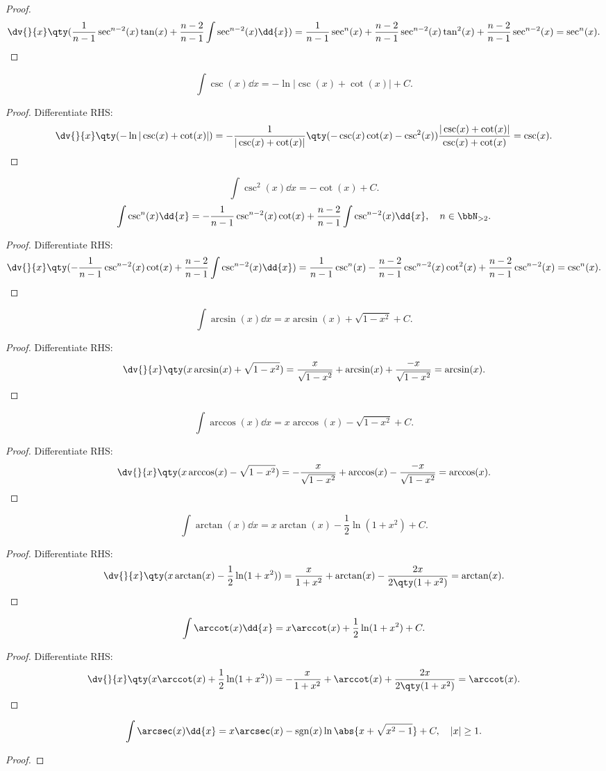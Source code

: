 \documentclass[a4paper,12pt]{report}
\begin{document}
\begin{itemize}
\begin{itemize}
\begin{proof}
    \[\dv{}{x}\qty(\frac{1}{n-1}\sec^{n-2}(x)\tan(x)+\frac{n-2}{n-1}\int\sec^{n-2}(x)\dd{x})=\frac{1}{n-1}\sec^n(x)+\frac{n-2}{n-1}\sec^{n-2}(x)\tan^2(x)+\frac{n-2}{n-1}\sec^{n-2}(x)=\sec^n(x).\]
\end{proof}
\[\int\csc(x)\dd{x}=-\ln|\csc(x)+\cot(x)|+C.\]
\begin{proof}
    Differentiate RHS:
    \[\dv{}{x}\qty(-\ln|\csc(x)+\cot(x)|)=-\frac{1}{|\csc(x)+\cot(x)|}\qty(-\csc(x)\cot(x)-\csc^2(x))\frac{|\csc(x)+\cot(x)|}{\csc(x)+\cot(x)}=\csc(x).\]
\end{proof}
\[\int\csc^2(x)\dd{x}=-\cot(x)+C.\]
\[\int\csc^n(x)\dd{x}=-\frac{1}{n-1}\csc^{n-2}(x)\cot(x)+\frac{n-2}{n-1}\int\csc^{n-2}(x)\dd{x},\quad n\in\bbN_{>2}.\]
\begin{proof}
    Differentiate RHS:
    \[\dv{}{x}\qty(-\frac{1}{n-1}\csc^{n-2}(x)\cot(x)+\frac{n-2}{n-1}\int\csc^{n-2}(x)\dd{x})=\frac{1}{n-1}\csc^n(x)-\frac{n-2}{n-1}\csc^{n-2}(x)\cot^2(x)+\frac{n-2}{n-1}\csc^{n-2}(x)=\csc^n(x).\]
\end{proof}
\[\int\arcsin(x)\dd{x}=x\arcsin(x)+\sqrt{1-x^2}+C.\]
\begin{proof}
    Differentiate RHS:
    \[\dv{}{x}\qty(x\arcsin(x)+\sqrt{1-x^2})=\frac{x}{\sqrt{1-x^2}}+\arcsin(x)+\frac{-x}{\sqrt{1-x^2}}=\arcsin(x).\]
\end{proof}
\[\int\arccos(x)\dd{x}=x\arccos(x)-\sqrt{1-x^2}+C.\]
\begin{proof}
    Differentiate RHS:
    \[\dv{}{x}\qty(x\arccos(x)-\sqrt{1-x^2})=-\frac{x}{\sqrt{1-x^2}}+\arccos(x)-\frac{-x}{\sqrt{1-x^2}}=\arccos(x).\]
\end{proof}
\[\int\arctan(x)\dd{x}=x\arctan(x)-\frac{1}{2}\ln(1+x^2)+C.\]
\begin{proof}
    Differentiate RHS:
    \[\dv{}{x}\qty(x\arctan(x)-\frac{1}{2}\ln(1+x^2))=\frac{x}{1+x^2}+\arctan(x)-\frac{2x}{2\qty(1+x^2)}=\arctan(x).\]
\end{proof}
\[\int\arccot(x)\dd{x}=x\arccot(x)+\frac{1}{2}\ln(1+x^2)+C.\]
\begin{proof}
    Differentiate RHS:
    \[\dv{}{x}\qty(x\arccot(x)+\frac{1}{2}\ln(1+x^2))=-\frac{x}{1+x^2}+\arccot(x)+\frac{2x}{2\qty(1+x^2)}=\arccot(x).\]
\end{proof}
\[\int\arcsec(x)\dd{x}=x\arcsec(x)-\operatorname{sgn}(x)\ln\abs{x+\sqrt{x^2-1}}+C,\quad|x|\geq 1.\]
\begin{proof}

\end{proof}
\end{itemize}
\end{itemize}
\end{document}
